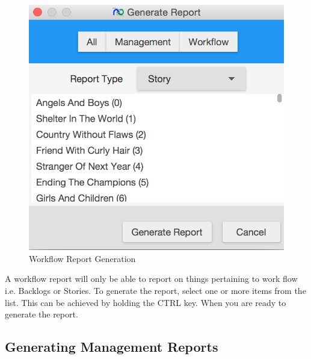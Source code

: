 \begin{figure}[H]
	\centering
	\includegraphics[width=\textwidth]{images/screenshots/report3.PNG}
	\caption{Workflow Report Generation}
	\label{fig:generate_report_workflow}
\end{figure}

A workflow report will only be able to report on things pertaining to work flow i.e. Backlogs or Stories. To generate the report, select one or more items from the list. This can be achieved by holding the CTRL key. When you are ready to generate the report.

\subsection{Generating Management Reports}

